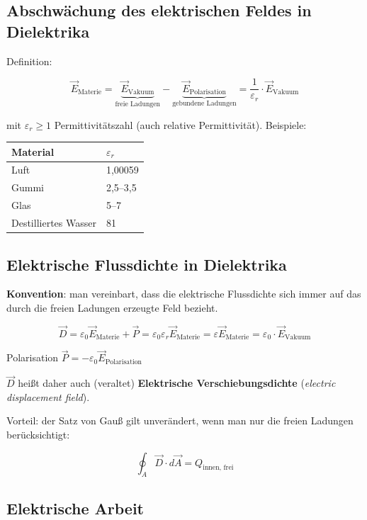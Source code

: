 \documentclass[
  11pt,
]{article}
\begin{document}
\subsection{Abschwächung des elektrischen Feldes in
Dielektrika}\label{abschwuxe4chung-des-elektrischen-feldes-in-dielektrika}

Definition:

\[\vec{E}_\text{Materie} = \underbrace{\vec{E}_\text{Vakuum}}_{\text{freie Ladungen}} - \underbrace{\vec{E}_\text{Polarisation}}_{\text{gebundene Ladungen}} = \frac{1}{\varepsilon_r} \cdot \vec{E}_\text{Vakuum}\]

mit \(\varepsilon_r \geq 1\) Permittivitätszahl (auch relative
Permittivität). Beispiele:

\begin{longtable}[]{@{}ll@{}}
\toprule\noalign{}
Material & \(\varepsilon_r\) \\
\midrule\noalign{}
\endhead
\bottomrule\noalign{}
\endlastfoot
Luft & 1,00059 \\
Gummi & 2,5--3,5 \\
Glas & 5--7 \\
Destilliertes Wasser & 81 \\
\end{longtable}

\subsection{Elektrische Flussdichte in
Dielektrika}\label{elektrische-flussdichte-in-dielektrika}

\textbf{Konvention}: man vereinbart, dass die elektrische Flussdichte
sich immer auf das durch die freien Ladungen erzeugte Feld bezieht.

\[\vec{D} =\varepsilon_0 \vec{E}_\text{Materie} + \vec{P} = \varepsilon_0 \varepsilon_r \vec{E}_\text{Materie} = 
\varepsilon \vec{E}_\text{Materie} = \varepsilon_0 \cdot \vec{E}_\text{Vakuum}\]

Polarisation \(\vec{P}= -\varepsilon_0 \vec{E}_\text{Polarisation}\)

\(\vec{D}\) heißt daher auch (veraltet) \textbf{Elektrische
Verschiebungsdichte} (\emph{electric displacement field}).

Vorteil: der Satz von Gauß gilt unverändert, wenn man nur die freien
Ladungen berücksichtigt:

\[\oint_{A} \vec{D} \cdot d\vec{A} = Q_{\text{innen, frei}}\]

\subsection{Elektrische Arbeit}\label{elektrische-arbeit}
\end{document}
